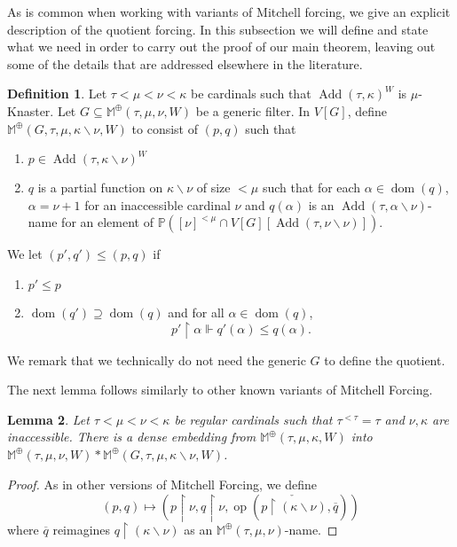 \documentclass[a4paper]{amsart}
\theoremstyle{definition}
\newtheorem{mydef}{Definition}[section]
\theoremstyle{remark}
\theoremstyle{plain}
\newtheorem{mylem}[mydef]{Lemma}
\numberwithin{mydef}{section}
\DeclareMathOperator{\dom}{dom}
\DeclareMathOperator{\Add}{Add}
\DeclareMathOperator{\op}{op}
\newcommand{\dM}{\mathbb{M}}
\newcommand{\dP}{\mathbb{P}}
\newcommand{\uhr}{\upharpoonright}
\begin{document}
	
	As is common when working with variants of Mitchell forcing, we give an explicit description of the quotient forcing. In this subsection we will define and state what we need in order to carry out the proof of our main theorem, leaving out some of the details that are addressed elsewhere in the literature.	
	
	\begin{mydef}
		Let $\tau<\mu<\nu<\kappa$ be cardinals such that $\Add(\tau,\kappa)^W$ is $\mu$-Knaster. Let $G\subseteq\dM^\oplus(\tau,\mu,\nu,W)$ be a generic filter. In $V[G]$, define $\dM^\oplus(G,\tau,\mu,\kappa\smallsetminus\nu,W)$ to consist of $(p,q)$ such that
		\begin{enumerate}
			\item $p\in\Add(\tau,\kappa\smallsetminus\nu)^W$
			\item $q$ is a partial function on $\kappa\smallsetminus\nu$ of size $<\mu$ such that for each $\alpha\in\dom(q)$, $\alpha=\nu+1$ for an inaccessible cardinal $\nu$ and $q(\alpha)$ is an $\Add(\tau,\alpha\smallsetminus\nu)$-name for an element of $\dP([\nu]^{<\mu}\cap V[G][\Add(\tau,\nu\smallsetminus\nu)])$.
		\end{enumerate}
		We let $(p',q')\leq(p,q)$ if
		\begin{enumerate}
			\item $p'\leq p$
			\item $\dom(q')\supseteq\dom(q)$ and for all $\alpha\in\dom(q)$,
			$$p'\uhr\alpha\Vdash q'(\alpha)\leq q(\alpha).$$
		\end{enumerate}
	\end{mydef}
	
	We remark that we technically do not need the generic $G$ to define the quotient.
	
	The next lemma follows similarly to other known variants of Mitchell Forcing.
	
	\begin{mylem}\label{M3Decom}
		Let $\tau<\mu<\nu<\kappa$ be regular cardinals such that $\tau^{<\tau}=\tau$ and $\nu,\kappa$ are inaccessible. There is a dense embedding from $\dM^\oplus(\tau,\mu,\kappa,W)$ into $\dM^\oplus(\tau,\mu,\nu,W)*\dM^\oplus(G,\tau,\mu,\kappa\smallsetminus\nu,W)$.
	\end{mylem}
	
	\begin{proof}
		As in other versions of Mitchell Forcing, we define
		$$(p,q)\mapsto(p\uhr\nu,q\uhr\nu,\op(\check{p\uhr(\kappa\smallsetminus\nu)},\overline{q}))$$
		where $\overline{q}$ reimagines $q\uhr(\kappa\smallsetminus\nu)$ as an $\dM^\oplus(\tau,\mu,\nu)$-name.
	\end{proof}
	
\end{document}
